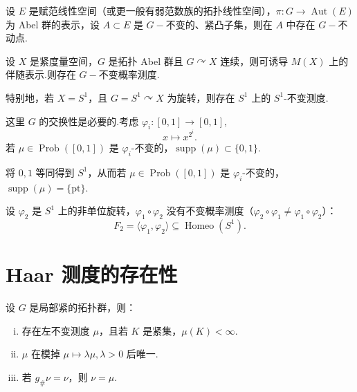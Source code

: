 \begin{theorem}
设 $E$ 是赋范线性空间（或更一般有弱范数族的拓扑线性空间），$\pi: G \to \operatorname{Aut}(E)$ 为 Abel 群的表示，设 $A \subset E$ 是 $G-\!\!$不变的、紧凸子集，则在 $A$ 中存在 $G-\!\!$不动点.
\end{theorem}

\begin{corollary}
设 $X$ 是紧度量空间，$G$ 是拓扑 Abel 群且 $G \curvearrowright X$ 连续，则可诱导 $M(X)$ 上的伴随表示.则存在 $G-\!\!$不变概率测度.\par
特别地，若 $X = S^1$，且 $G = S^1 \curvearrowright X$ 为旋转，则存在 $S^1$ 上的 $S^1$-不变测度.
\end{corollary}

\begin{instance}
这里 $G$ 的交换性是必要的.考虑 $\varphi_i: [0,1] \to [0,1]$,
\begin{equation*}
x \mapsto x^{2^i}.
\end{equation*}
若 $\mu \in \operatorname{Prob}([0,1])$ 是 $\varphi_i$-不变的，$\operatorname{supp}(\mu) \subset \{0,1\}$.\par
将 $0,1$ 等同得到 $S^1$，从而若 $\mu \in \operatorname{Prob}([0,1])$ 是 $\varphi_i$-不变的，$\operatorname{supp}(\mu) = \{\mathrm{pt}\}$.\par
设 $\varphi_2$ 是 $S^1$ 上的非单位旋转，$\varphi_1 \circ \varphi_2$ 没有不变概率测度（$\varphi_2 \circ \varphi_1 \neq \varphi_1 \circ \varphi_2$）：
\begin{equation*}
F_2 = \langle \varphi_1, \varphi_2 \rangle \subseteq \operatorname{Homeo}(S^1).
\end{equation*}
\end{instance}

\section{Haar 测度的存在性}

\begin{theorem}[Haar 测度]
设 $G$ 是局部紧的拓扑群，则：
\begin{enumerate}[(i)]
\item 存在左不变测度 $\mu$，且若 $K$ 是紧集，$\mu(K) < \infty$.
\item $\mu$ 在模掉 $\mu \mapsto \lambda \mu, \lambda > 0$ 后唯一.
\item 若 $g_{\#}\nu = \nu$，则 $\nu = \mu$.
\end{enumerate}
\end{theorem}

